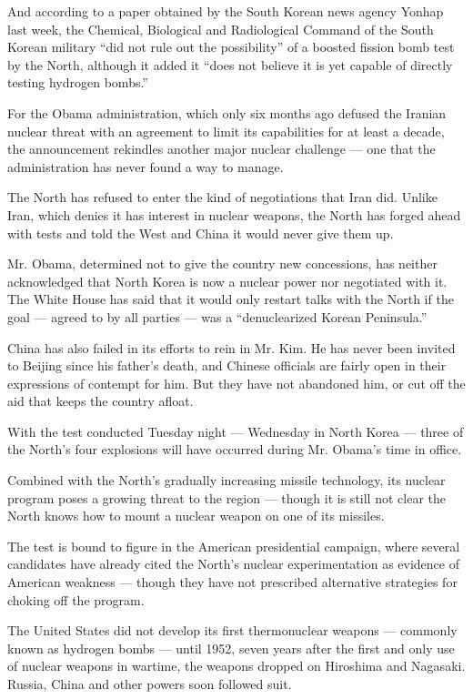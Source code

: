 And according to a paper obtained by the South Korean news agency Yonhap
last week, the Chemical, Biological and Radiological Command of the
South Korean military ``did not rule out the possibility'' of a boosted
fission bomb test by the North, although it added it ``does not believe
it is yet capable of directly testing hydrogen bombs.''

For the Obama administration, which only six months ago defused the
Iranian nuclear threat with an agreement to limit its capabilities for
at least a decade, the announcement rekindles another major nuclear
challenge --- one that the administration has never found a way to
manage.

The North has refused to enter the kind of negotiations that Iran did.
Unlike Iran, which denies it has interest in nuclear weapons, the North
has forged ahead with tests and told the West and China it would never
give them up.

Mr. Obama, determined not to give the country new concessions, has
neither acknowledged that North Korea is now a nuclear power nor
negotiated with it. The White House has said that it would only restart
talks with the North if the goal --- agreed to by all parties --- was a
``denuclearized Korean Peninsula.''

China has also failed in its efforts to rein in Mr. Kim. He has never
been invited to Beijing since his father's death, and Chinese officials
are fairly open in their expressions of contempt for him. But they have
not abandoned him, or cut off the aid that keeps the country afloat.

With the test conducted Tuesday night --- Wednesday in North Korea ---
three of the North's four explosions will have occurred during Mr.
Obama's time in office.

Combined with the North's gradually increasing missile technology, its
nuclear program poses a growing threat to the region --- though it is
still not clear the North knows how to mount a nuclear weapon on one of
its missiles.

The test is bound to figure in the American presidential campaign, where
several candidates have already cited the North's nuclear
experimentation as evidence of American weakness --- though they have
not prescribed alternative strategies for choking off the program.

The United States did not develop its first thermonuclear weapons ---
commonly known as hydrogen bombs --- until 1952, seven years after the
first and only use of nuclear weapons in wartime, the weapons dropped on
Hiroshima and Nagasaki. Russia, China and other powers soon followed
suit.

